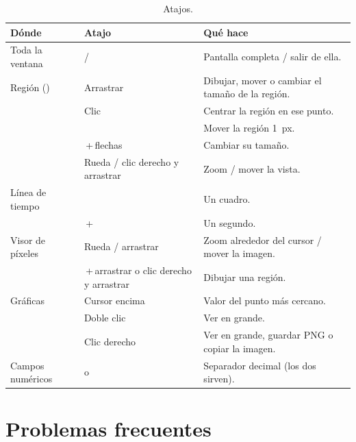 \begin{table}[H]
\centering\small
\begin{tabularx}{\linewidth}{@{}l l Y@{}}
\toprule
Dónde & Atajo & Qué hace\\
\midrule
Toda la ventana &  /  & Pantalla completa / salir de ella.\\
Región () & Arrastrar & Dibujar, mover o cambiar el tamaño de la región.\\
 & Clic & Centrar la región en ese punto.\\
 &  & Mover la región 1~px.\\
 & \,+\,flechas & Cambiar su tamaño.\\
 & Rueda / clic derecho y arrastrar & Zoom / mover la vista.\\
Línea de tiempo & \, & Un cuadro.\\
 & \,+\,\, & Un segundo.\\
Visor de píxeles & Rueda / arrastrar & Zoom alrededor del cursor / mover la imagen.\\
 & \,+\,arrastrar o clic derecho y arrastrar & Dibujar una región.\\
Gráficas & Cursor encima & Valor del punto más cercano.\\
 & Doble clic & Ver en grande.\\
 & Clic derecho & Ver en grande, guardar PNG o copiar la imagen.\\
Campos numéricos &  o \tecla{,} & Separador decimal (los dos sirven).\\
\bottomrule
\end{tabularx}
\caption{Atajos.}
\end{table}

\section{Problemas frecuentes}

